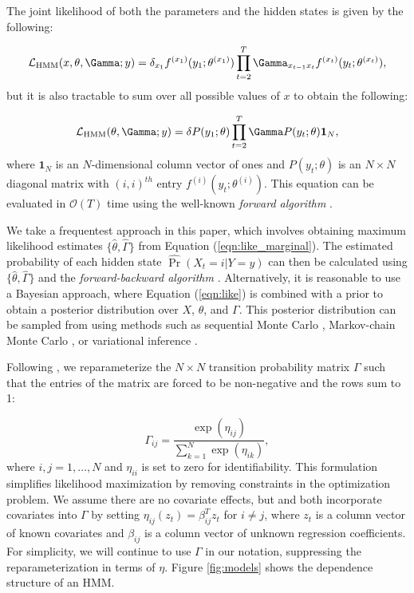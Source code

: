 The joint likelihood of both the parameters and the hidden states is given by the following:

\begin{equation}
    \calL_{\text{HMM}}(x,\theta,\Gamma;y) = \delta_{x_1} f^{(x_1)}(y_1; \theta^{(x_1)}) \prod_{t=2}^T \Gamma_{x_{t-1} x_t} f^{(x_t)}(y_t; \theta^{(x_t)}),
    \label{eqn:like}
\end{equation}
%
but it is also tractable to sum over all possible values of $x$ to obtain the following:

\begin{equation}
    \calL_{\text{HMM}}(\theta,\Gamma;y) = \delta P(y_1;\theta) \prod_{t=2}^T \Gamma P(y_t;\theta) \mathbf{1}_N,
    \label{eqn:like_marginal}
\end{equation}
%
where $\mathbf{1}_N$ is an $N$-dimensional column vector of ones and $P(y_t;\theta)$ is an $N \times N$ diagonal matrix with $(i,i)^{th}$ entry $f^{(i)}(y_t; \theta^{(i)})$. This equation can be evaluated in $\mathcal{O}(T)$ time using the well-known \textit{forward algorithm} \citep{Zucchini:2016}.

We take a frequentest approach in this paper, which involves obtaining maximum likelihood estimates $\{\hat \theta, \hat \Gamma\}$ from Equation (\ref{eqn:like_marginal}). The estimated probability of each hidden state $\hat{\Pr}(X_t = i|Y = y)$ can then be calculated using $\{\hat \theta, \hat \Gamma\}$ and the \textit{forward-backward algorithm} \citep{Zucchini:2016}. Alternatively, it is reasonable to use a Bayesian approach, where Equation (\ref{eqn:like}) is combined with a prior to obtain a posterior distribution over $X$, $\theta$, and $\Gamma$. This posterior distribution can be sampled from using methods such as sequential Monte Carlo \citep{Douc:2011b}, Markov-chain Monte Carlo \citep{Scott:2002}, or variational inference \citep{Foti:2014}.
%

Following \citet{Barajas:2017}, we reparameterize the $N \times N$ transition probability matrix $\Gamma$ such that the entries of the matrix are forced to be non-negative and the rows sum to 1:

\[
\Gamma_{ij} = \frac{\exp(\eta_{ij})}{\sum_{k=1}^N \exp(\eta_{ik})}, 
\]
%
where $i,j = 1,\ldots,N$ and $\eta_{ii}$ is set to zero for identifiability. This formulation simplifies likelihood maximization by removing constraints in the optimization problem. We assume there are no covariate effects, but \cite{DeSouza:2017} and \citet{Adam:2019} both incorporate covariates into $\Gamma$ by setting $\eta_{ij}(z_t) = \beta_{ij}^T z_t$ for $i \neq j$, where $z_t$ is a column vector of known covariates and $\beta_{ij}$ is a column vector of unknown regression coefficients. For simplicity, we will continue to use $\Gamma$ in our notation, suppressing the reparameterization in terms of $\eta$. Figure \ref{fig:models} shows the dependence structure of an HMM.

